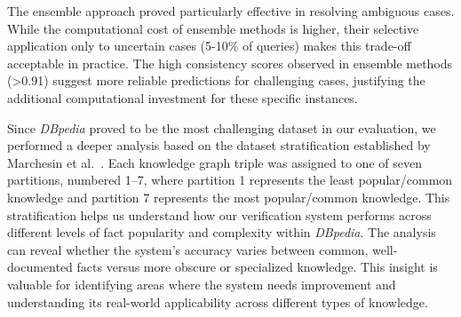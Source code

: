 The ensemble approach proved particularly effective in resolving ambiguous cases.
While the computational cost of ensemble methods is higher, their selective application only to uncertain cases (5-10\% of queries) makes this trade-off acceptable in practice.
The high consistency scores observed in ensemble methods (>0.91) suggest more reliable predictions for challenging cases, justifying the additional computational investment for these specific instances.

Since \textit{DBpedia} proved to be the most challenging dataset in our evaluation, we performed a deeper analysis based on the dataset stratification established by Marchesin et al.~\cite{Marchesin_Silvello_Alonso_2024}.
Each knowledge graph triple was assigned to one of seven partitions, numbered 1--7, where partition 1 represents the least popular/common knowledge and partition 7 represents the most popular/common knowledge.
This stratification helps us understand how our verification system performs across different levels of fact popularity and complexity within \textit{DBpedia}.
The analysis can reveal whether the system's accuracy varies between common, well-documented facts versus more obscure or specialized knowledge.
This insight is valuable for identifying areas where the system needs improvement and understanding its real-world applicability across different types of knowledge.


